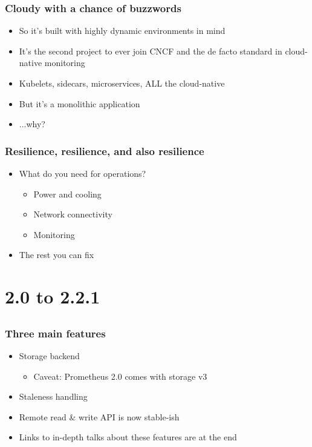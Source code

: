 \documentclass[t]{beamer}
\begin{document}
\begin{frame}
	\frametitle{Cloudy with a chance of buzzwords}
	\begin{itemize}
		\item So it's built with highly dynamic environments in mind
		\item It's the second project to ever join CNCF and the de facto standard in cloud-native monitoring
		\item Kubelets, sidecars, microservices, ALL the cloud-native
		\vfill
		\item But it's a monolithic application
		\vfill
		\item ...why?
	\end{itemize}
\end{frame}

\begin{frame}
	\frametitle{Resilience, resilience, and also resilience}
	\begin{itemize}
		\item What do you need for operations?
		\begin{itemize}
			\item Power and cooling
			\item Network connectivity
			\item Monitoring
		\end{itemize}
		\item The rest you can fix
	\end{itemize}
\end{frame}


\section{2.0 to 2.2.1}
\subsection{}

\begin{frame}
	\frametitle{Three main features}
	\begin{itemize}
		\item Storage backend
		\begin{itemize}
			\item Caveat: Prometheus 2.0 comes with storage v3
		\end{itemize}
		\item Staleness handling
		\item Remote read \& write API is now stable-ish
		\item Links to in-depth talks about these features are at the end
	\end{itemize}
\end{frame}
\end{document}
